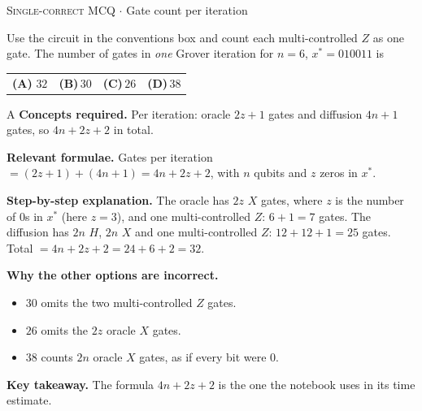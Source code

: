\documentclass[11pt,a4paper]{article}
\newcommand{\optlabel}[1]{\textbf{(#1)}}
\newcommand{\correctlabel}[1]{\textcolor{okgreen}{\textbf{(#1)}\,\ding{51}}}
\newenvironment{qitem}[1]{\begin{list}{}{\setlength{\leftmargin}{3.3em}\setlength{\labelwidth}{3.1em}%
  \setlength{\labelsep}{0.2em}\setlength{\topsep}{3pt}\setlength{\parsep}{3pt}}\item[\textbf{Q.#1}\hfill]}{\end{list}}
\newcommand{\qsep}{\par\vspace{2pt}{\color{black!15}\hrule}\vspace{4pt}}
\newcommand{\qmeta}[2]{{\footnotesize\color{black!60}\textsc{#1} \;$\cdot$\; #2}\par}
\begin{document}
\begin{qitem}{46}
\qmeta{Single-correct MCQ}{Gate count per iteration}
Use the circuit in the conventions box and count each multi-controlled $Z$ as one gate. The number of gates in \emph{one} Grover iteration for $n = 6$, $x^\ast = 010011$ is
\par\smallskip\noindent\begin{tabularx}{\linewidth}{@{}*{4}{L}@{}}
\correctlabel{A}\,$32$ & \optlabel{B}\,$30$ & \optlabel{C}\,$26$ & \optlabel{D}\,$38$
\end{tabularx}
\end{qitem}
\begin{solbox}{A}
\textbf{\color{brand}Concepts required.} Per iteration: oracle $2z + 1$ gates and diffusion $4n + 1$ gates, so $4n + 2z + 2$ in total.

\textbf{\color{brand}Relevant formulae.} Gates per iteration $= (2z + 1) + (4n + 1) = 4n + 2z + 2$, with $n$ qubits and $z$ zeros in $x^\ast$.

\textbf{\color{brand}Step-by-step explanation.} The oracle has $2z$ $X$ gates, where $z$ is the number of $0$s in $x^\ast$ (here $z = 3$), and one multi-controlled $Z$: $6 + 1 = 7$ gates.
The diffusion has $2n$ $H$, $2n$ $X$ and one multi-controlled $Z$: $12 + 12 + 1 = 25$ gates. Total $= 4n + 2z + 2 = 24 + 6 + 2 = 32$.

\textbf{\color{brand}Why the other options are incorrect.}
\begin{itemize}[leftmargin=2.4em, itemsep=1pt, topsep=2pt]
\item[\textbf{(B)}] $30$ omits the two multi-controlled $Z$ gates.
\item[\textbf{(C)}] $26$ omits the $2z$ oracle $X$ gates.
\item[\textbf{(D)}] $38$ counts $2n$ oracle $X$ gates, as if every bit were $0$.
\end{itemize}
\textbf{\color{brand}Key takeaway.} The formula $4n + 2z + 2$ is the one the notebook uses in its time estimate.
\end{solbox}
\qsep
\end{document}
